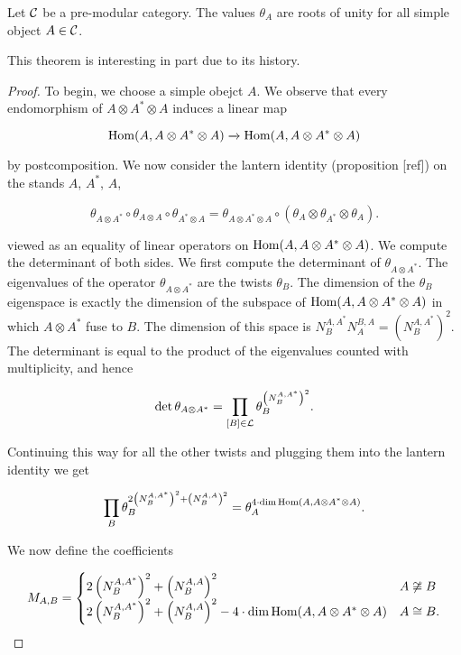 \begin{thrm}[Vafa] Let ${\mathcal C}$ be a pre-modular category. The values $\theta_{A}$ are roots of unity for all simple object $A\in {\mathcal C}$.
\end{thrm}
\begin{rem} This theorem is interesting in part due to its history. 
\end{rem}
\begin{proof} To begin, we choose a simple obejct $A$. We observe that every endomorphism of $A\otimes A^*\otimes A$ induces a linear map

$$\operatorname{Hom}(A,A\otimes A^*\otimes A) \xrightarrow{} \operatorname{Hom}(A,A\otimes A^*\otimes A)$$

by postcomposition. We now consider the lantern identity (proposition [ref]) on the stands $A$, $A^*$, $A$,

$$\theta_{A\otimes A^*}\circ \theta_{A\otimes A}\circ \theta_{A^*\otimes A} = \theta_{A\otimes A^*\otimes A}\circ (\theta_{A}\otimes \theta_{A^*}\otimes \theta_{A}).$$

viewed as an equality of linear operators on $\operatorname{Hom}(A,A\otimes A^*\otimes A)$. We compute the determinant of both sides. We first compute the determinant of $\theta_{A\otimes A^*}$. The eigenvalues of the operator $\theta_{A\otimes A^*}$ are the twists $\theta_{B}$. The dimension of the $\theta_{B}$ eigenspace is exactly the dimension of the subspace of $\operatorname{Hom}(A,A\otimes A^*\otimes A)$ in which $A\otimes A^*$ fuse to $B$. The dimension of this space is $N^{A,A^*}_{B}N^{B,A}_{A}=(N^{A,A^*}_{B})^2$. The determinant is equal to the product of the eigenvalues counted with multiplicity, and hence

$$\det \theta_{A\otimes A^*}= \prod_{[B]\in {\mathcal L}}\theta_{B}^{\left(N^{A,A^*}_{B}\right)^2}.$$

Continuing this way for all the other twists and plugging them into the lantern identity we get

$$\prod_{B}\theta_{B}^{2\left(N^{A,A^*}_{B}\right)^2+\left(N^{A,A}_{B}\right)^2}=\theta_{A}^{4\cdot \dim \operatorname{Hom}(A,A\otimes A^*\otimes A)}.$$

We now define the coefficients

$$
M_{A,B}=
\begin{cases}
2\left(N^{A,A^*}_{B}\right)^2+\left(N^{A,A}_{B}\right)^2 & A\not\cong B\\
2\left(N^{A,A^*}_{B}\right)^2+\left(N^{A,A}_{B}\right)^2 - 4\cdot \dim \operatorname{Hom}(A,A\otimes A^*\otimes A) & A\cong B.
\end{cases}
$$


\end{proof}
